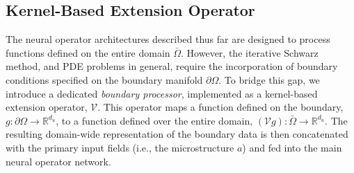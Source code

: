 \documentclass[preprint,11pt]{elsarticle}
\theoremstyle{plain}
\newcommand{\R}{\mathbb{R}}
\newcommand{\G}{\mathcal{G}}
\newcommand{\U}{\mathcal{U}}
\begin{document}



\subsection{Kernel-Based Extension Operator}
\label{sec:extension_operator}
The neural operator architectures described thus far are designed to process functions defined on the entire domain $\bar\Omega$. However, the iterative Schwarz method, and PDE problems in general, require the incorporation of boundary conditions specified on the boundary manifold $\partial \Omega$. To bridge this gap, we introduce a dedicated \textit{boundary processor}, implemented as a kernel-based extension operator, $\mathcal{V}$. This operator maps a function defined on the boundary, $g: \partial \Omega \to \mathbb{R}^{d_u}$, to a function defined over the entire domain, $(\mathcal{V}g): \bar\Omega \to \mathbb{R}^{d_u}$. The resulting domain-wide representation of the boundary data is then concatenated with the primary input fields (i.e., the microstructure $a$) and fed into the main neural operator network.
\end{document}
